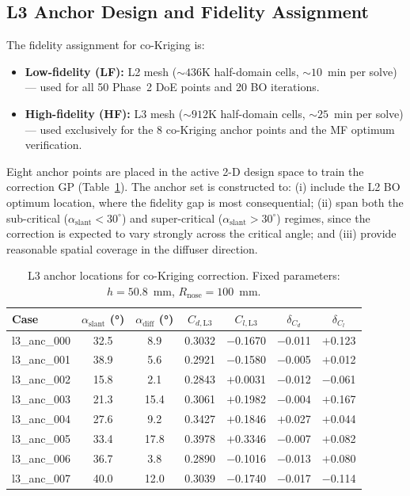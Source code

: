 \subsection{L3 Anchor Design and Fidelity Assignment}
\label{sec:l3_anchors}

The fidelity assignment for co-Kriging is:
\begin{itemize}[noitemsep]
    \item \textbf{Low-fidelity (LF):} L2 mesh (${\sim}436$K half-domain cells, ${\sim}10$~min per solve) — used for all 50 Phase~2 DoE points and 20 BO iterations.
    \item \textbf{High-fidelity (HF):} L3 mesh (${\sim}912$K half-domain cells, ${\sim}25$~min per solve) — used exclusively for the 8 co-Kriging anchor points and the MF optimum verification.
\end{itemize}

Eight anchor points are placed in the active 2-D design space to train the correction GP (Table~\ref{tab:l3_anchors}). The anchor set is constructed to: (i) include the L2 BO optimum location, where the fidelity gap is most consequential; (ii) span both the sub-critical ($\alpha_\mathrm{slant} < 30^\circ$) and super-critical ($\alpha_\mathrm{slant} > 30^\circ$) regimes, since the correction is expected to vary strongly across the critical angle; and (iii) provide reasonable spatial coverage in the diffuser direction.

\begin{table}[h]
    \centering
    \caption{L3 anchor locations for co-Kriging correction. Fixed parameters: $h = 50.8$~mm, $R_\mathrm{nose} = 100$~mm.}
    \label{tab:l3_anchors}
    \begin{tabular}{lcccccc}
        \toprule
        Case & $\alpha_\mathrm{slant}$ (°) & $\alpha_\mathrm{diff}$ (°) & $C_{d,\mathrm{L3}}$ & $C_{l,\mathrm{L3}}$ & $\delta_{C_d}$ & $\delta_{C_l}$ \\
        \midrule
        l3\_anc\_000 & 32.5 &  8.9 & 0.3032 & $-$0.1670 & $-$0.011 & $+$0.123 \\
        l3\_anc\_001 & 38.9 &  5.6 & 0.2921 & $-$0.1580 & $-$0.005 & $+$0.012 \\
        l3\_anc\_002 & 15.8 &  2.1 & 0.2843 & $+$0.0031 & $-$0.012 & $-$0.061 \\
        l3\_anc\_003 & 21.3 & 15.4 & 0.3061 & $+$0.1982 & $-$0.004 & $+$0.167 \\
        l3\_anc\_004 & 27.6 &  9.2 & 0.3427 & $+$0.1846 & $+$0.027 & $+$0.044 \\
        l3\_anc\_005 & 33.4 & 17.8 & 0.3978 & $+$0.3346 & $-$0.007 & $+$0.082 \\
        l3\_anc\_006 & 36.7 &  3.8 & 0.2890 & $-$0.1016 & $-$0.013 & $+$0.080 \\
        l3\_anc\_007 & 40.0 & 12.0 & 0.3039 & $-$0.1740 & $-$0.017 & $-$0.114 \\
        \bottomrule
    \end{tabular}
\end{table}
